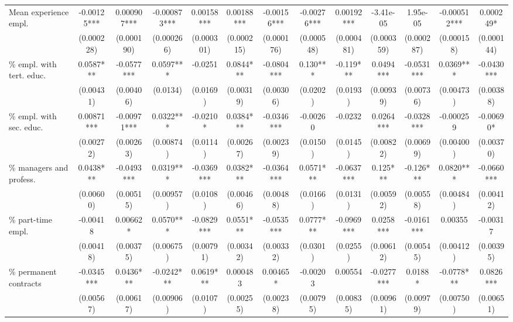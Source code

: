 {\begin{threeparttable}
\begin{tabular}{l*{12}{S}}
Mean experience empl.           &       -0.00125*** & 0.000907*** & -0.000873*** & 0.00158*** & 0.00188*** & -0.00156*** & -0.00276*** & 0.00192*** & -3.41e-05  & 1.95e-05   & -0.000512*** & 0.000249*  \\
                                &       (0.000228)  & (0.000190)  & (0.000266)   & (0.000301) & (0.000215) & (0.000176)  & (0.000548)  & (0.000481) & (0.000359) & (0.000287) & (0.000158)   & (0.000144) \\[1ex]
\% empl. with tert. educ.       &       0.0587***   & -0.0577***  & 0.0597***    & -0.0251    & 0.0844***  & -0.0804***  & 0.130***    & -0.119***  & 0.0494***  & -0.0531*** & 0.0369***    & -0.0430*** \\
                                &       (0.00431)   & (0.00406)   & (0.0134)     & (0.0169)   & (0.00319)  & (0.00306)   & (0.0202)    & (0.0193)   & (0.00939)  & (0.00736)  & (0.00473)    & (0.00388)  \\[1ex]
\% empl. with sec. educ.        &       0.00871***  & -0.00971*** & 0.0322***    & -0.0210*   & 0.0384***  & -0.0346***  & -0.00260    & -0.0232    & 0.0264***  & -0.0328*** & -0.000259    & -0.00690*  \\
                                &       (0.00272)   & (0.00263)   & (0.00874)    & (0.0114)   & (0.00267)  & (0.00239)   & (0.0150)    & (0.0145)   & (0.00822)  & (0.00699)  & (0.00400)    & (0.00370)  \\[1ex]
\% managers and profess.        &       0.0438***   & -0.0493***  & 0.0319***    & -0.0369*** & 0.0382***  & -0.0364***  & 0.0571***   & -0.0637*** & 0.125***   & -0.126***  & 0.0820***    & -0.0660*** \\
                                &       (0.00600)   & (0.00515)   & (0.00957)    & (0.0108)   & (0.00466)  & (0.00488)   & (0.0166)    & (0.0131)   & (0.00592)  & (0.00558)  & (0.00484)    & (0.00412)  \\[1ex]
\% part-time empl.              &       -0.00418    & 0.00662*    & 0.0570***    & -0.0829*** & 0.0551***  & -0.0535***  & 0.0777***   & -0.0969*** & 0.0258***  & -0.0161*** & 0.00355      & -0.00317   \\
                                &       (0.00418)   & (0.00375)   & (0.00675)    & (0.00791)  & (0.00342)  & (0.00332)   & (0.0301)    & (0.0255)   & (0.00612)  & (0.00545)  & (0.00412)    & (0.00395)  \\[1ex]
\% permanent contracts          &       -0.0345***  & 0.0436***   & -0.0242***   & 0.0619***  & 0.000483   & 0.00465*    & -0.00203    & 0.00554    & -0.0277*** & 0.0188*    & -0.0778***   & 0.0826***  \\
                                &       (0.00567)   & (0.00617)   & (0.00906)    & (0.0107)   & (0.00255)  & (0.00238)   & (0.00795)   & (0.00835)  & (0.00961)  & (0.00979)  & (0.00750)    & (0.00651)  \\[1ex]


\end{tabular}
\end{threeparttable}}
